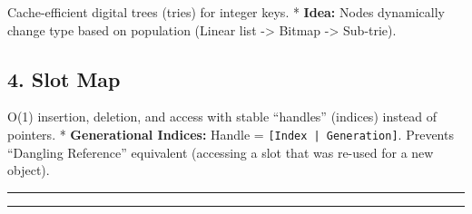 Cache-efficient digital trees (tries) for integer keys. * \textbf{Idea:}
Nodes dynamically change type based on population (Linear list
-\textgreater{} Bitmap -\textgreater{} Sub-trie).

\hypertarget{slot-map}{%
\subsection{4. Slot Map}\label{slot-map}}

O(1) insertion, deletion, and access with stable ``handles'' (indices)
instead of pointers. * \textbf{Generational Indices:} Handle =
\passthrough{\lstinline![Index | Generation]!}. Prevents ``Dangling
Reference'' equivalent (accessing a slot that was re-used for a new
object).

\begin{center}\rule{0.5\linewidth}{0.5pt}\end{center}

\begin{center}\rule{0.5\linewidth}{0.5pt}\end{center}

